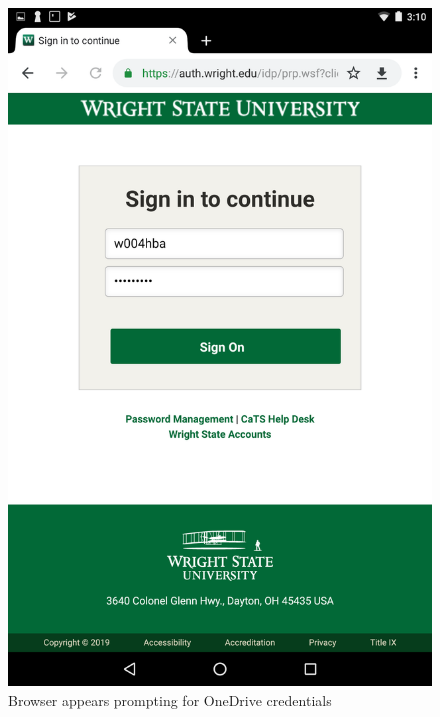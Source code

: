 \begin{figure}[htb]
  \centering
  \includegraphics[scale=0.2]{images/onedrive1.png}
  \caption{Browser appears prompting for OneDrive credentials}
  \label{fig:onedrive1}
\end{figure}
